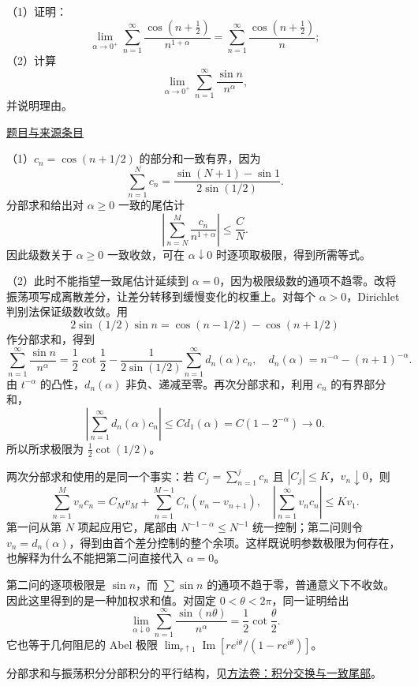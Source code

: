 \documentclass[UTF8,12pt,a4paper,fontset=fandol]{ctexart}
\begin{document}
\begin{example}[来源序号6]\label{ex:ch08-13th-A-makeup:6}\label{pr:ch08-13th-A-makeup:6}

（1）证明：
\[
\lim_{\alpha\to 0^{+}}\sum_{n=1}^{\infty}\frac{\cos\left(n+\frac{1}{2}\right)}{n^{1+\alpha}}=\sum_{n=1}^{\infty}\frac{\cos\left(n+\frac{1}{2}\right)}{n};
\]
（2）计算
\[
\lim_{\alpha\to 0^{+}}\sum_{n=1}^{\infty}\frac{\sin n}{n^{\alpha}},
\]
并说明理由。

\par\href{https://github.com/lzxcr/cmc-mathematics/blob/64916fa1fdbc3e444a652eca204d5669058ee321/src/problems/preliminary/13-makeup/06.md}{题目与来源条目}

\end{example}

\begin{solve}\label{ans:ch08-13th-A-makeup:6}

（1）$c_n=\cos(n+1/2)$ 的部分和一致有界，因为
\[
\sum_{n=1}^N c_n=\frac{\sin(N+1)-\sin1}{2\sin(1/2)}.
\]
分部求和给出对 $\alpha\geq0$ 一致的尾估计
\[
\left|\sum_{n=N}^M\frac{c_n}{n^{1+\alpha}}\right|\leq\frac C N.
\]
因此级数关于 $\alpha\geq0$ 一致收敛，可在 $\alpha\downarrow0$ 时逐项取极限，得到所需等式。

（2）此时不能指望一致尾估计延续到 $\alpha=0$，因为极限级数的通项不趋零。改将振荡项写成离散差分，让差分转移到缓慢变化的权重上。对每个 $\alpha>0$，Dirichlet 判别法保证级数收敛。用
\[
2\sin(1/2)\sin n=\cos(n-1/2)-\cos(n+1/2)
\]
作分部求和，得到
\[
\sum_{n=1}^\infty\frac{\sin n}{n^\alpha}
=\frac12\cot\frac12
-\frac1{2\sin(1/2)}\sum_{n=1}^\infty d_n(\alpha)c_n,
\quad d_n(\alpha)=n^{-\alpha}-(n+1)^{-\alpha}.
\]
由 $t^{-\alpha}$ 的凸性，$d_n(\alpha)$ 非负、递减至零。再次分部求和，利用 $c_n$ 的有界部分和，
\[
\left|\sum_{n=1}^\infty d_n(\alpha)c_n\right|
\leq C d_1(\alpha)=C(1-2^{-\alpha})\longrightarrow0.
\]
所以所求极限为 $\tfrac12\cot(1/2)$。

两次分部求和使用的是同一个事实：若 $C_j=\sum_{n=1}^jc_n$ 且 $|C_j|\le K$，$v_n\downarrow0$，则
\[
\sum_{n=1}^Mv_nc_n=C_Mv_M+\sum_{n=1}^{M-1}C_n(v_n-v_{n+1}),
\quad
\left|\sum_{n=1}^\infty v_nc_n\right|\le Kv_1.
\]
第一问从第 $N$ 项起应用它，尾部由 $N^{-1-\alpha}\le N^{-1}$ 统一控制；第二问则令 $v_n=d_n(\alpha)$，得到由首个差分控制的整个余项。这样既说明参数极限为何存在，也解释为什么不能把第二问直接代入 $\alpha=0$。

\end{solve}

\begin{remark}[方法与条件]第二问的逐项极限是 $\sin n$，而 $\sum\sin n$ 的通项不趋于零，普通意义下不收敛。因此这里得到的是一种加权求和值。对固定 $0<\theta<2\pi$，同一证明给出
\[
\lim_{\alpha\downarrow0}\sum_{n=1}^\infty
\frac{\sin(n\theta)}{n^\alpha}=\frac12\cot\frac\theta2.
\]
它也等于几何阻尼的 Abel 极限 $\lim_{r\uparrow1}\operatorname{Im}[re^{i\theta}/(1-re^{i\theta})]$。

分部求和与振荡积分分部积分的平行结构，见\hyperref[app:integration-exchange]{方法卷：积分交换与一致尾部}。\end{remark}
\end{document}
